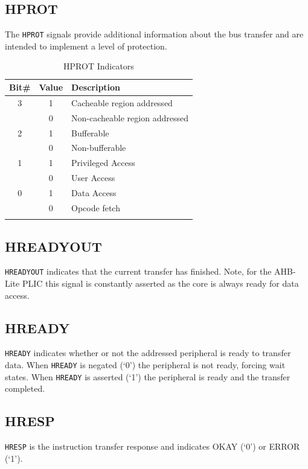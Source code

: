 \subsection{HPROT}

The \texttt{HPROT} signals provide additional information about the bus
transfer and are intended to implement a level of protection.

\begin{longtable}[c]{@{}ccl}	
	\toprule 
	\textbf{Bit\#} & \textbf{Value} & \textbf{Description}\\
	\midrule
	\endhead 
	3 & 1 & Cacheable region addressed\\
	& 0 & Non-cacheable region addressed\\
	2 & 1 & Bufferable\\
	& 0 & Non-bufferable\\
	1 & 1 & Privileged Access\\
	& 0 & User Access\\
	0 & 1 & Data Access\\
	& 0 & Opcode fetch\\
	\bottomrule 	
	\caption{HPROT Indicators}
	\label{tab:HPROT}
\end{longtable}


\subsection{HREADYOUT}

\texttt{HREADYOUT} indicates that the current transfer has finished.
Note, for the AHB-Lite PLIC this signal is constantly asserted as the
core is always ready for data access.

\subsection{HREADY}

\texttt{HREADY} indicates whether or not the addressed peripheral is
ready to transfer data. When \texttt{HREADY} is negated (`0') the
peripheral is not ready, forcing wait states. When \texttt{HREADY} is
asserted (`1') the peripheral is ready and the transfer completed.

\subsection{HRESP}

\texttt{HRESP} is the instruction transfer response and indicates OKAY
(`0') or ERROR (`1').

